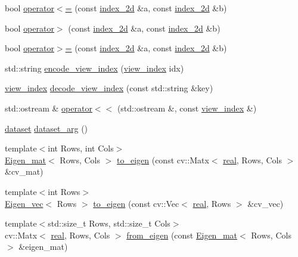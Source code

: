 \begin{DoxyCompactItemize}
\item 
bool \hyperlink{namespacetlz_a022202525838cdfe499e6d27ed189dc2}{operator$<$=} (const \hyperlink{structtlz_1_1index__2d}{index\+\_\+2d} \&a, const \hyperlink{structtlz_1_1index__2d}{index\+\_\+2d} \&b)
\item 
bool \hyperlink{namespacetlz_a9350c25db5668e3720cbf3797a4c879c}{operator$>$} (const \hyperlink{structtlz_1_1index__2d}{index\+\_\+2d} \&a, const \hyperlink{structtlz_1_1index__2d}{index\+\_\+2d} \&b)
\item 
bool \hyperlink{namespacetlz_a37ad12663e6d510b2e739434681b9e59}{operator$>$=} (const \hyperlink{structtlz_1_1index__2d}{index\+\_\+2d} \&a, const \hyperlink{structtlz_1_1index__2d}{index\+\_\+2d} \&b)
\item 
std\+::string \hyperlink{namespacetlz_aadab29bdc80bc1d0ad6d3784dd427992}{encode\+\_\+view\+\_\+index} (\hyperlink{structtlz_1_1view__index}{view\+\_\+index} idx)
\item 
\hyperlink{structtlz_1_1view__index}{view\+\_\+index} \hyperlink{namespacetlz_a74e8454f97dace7cffb1afdb6d3ca87b}{decode\+\_\+view\+\_\+index} (const std\+::string \&key)
\item 
std\+::ostream \& \hyperlink{namespacetlz_ae05c31549882702b59b5eb314196d14c}{operator$<$$<$} (std\+::ostream \&, const \hyperlink{structtlz_1_1view__index}{view\+\_\+index} \&)
\item 
\hyperlink{classtlz_1_1dataset}{dataset} \hyperlink{namespacetlz_a91f1aec7120c97452c495ee447e56b57}{dataset\+\_\+arg} ()
\item 
{\footnotesize template$<$int Rows, int Cols$>$ }\\\hyperlink{namespacetlz_a524ba0d1429b56ff27b8f86c218f9dff}{Eigen\+\_\+mat}$<$ Rows, Cols $>$ \hyperlink{namespacetlz_a029afc2252e5ecc8a0f98a571aa33a0a}{to\+\_\+eigen} (const cv\+::\+Matx$<$ \hyperlink{namespacetlz_a15fd37cce97f2b8b606af18c2615f602}{real}, Rows, Cols $>$ \&cv\+\_\+mat)
\item 
{\footnotesize template$<$int Rows$>$ }\\\hyperlink{namespacetlz_a2956723eeab1e0b07f733e404d96e20e}{Eigen\+\_\+vec}$<$ Rows $>$ \hyperlink{namespacetlz_ae59e2cb22a4d3ae9c8bffa491bc4eb98}{to\+\_\+eigen} (const cv\+::\+Vec$<$ \hyperlink{namespacetlz_a15fd37cce97f2b8b606af18c2615f602}{real}, Rows $>$ \&cv\+\_\+vec)
\item 
{\footnotesize template$<$std\+::size\+\_\+t Rows, std\+::size\+\_\+t Cols$>$ }\\cv\+::\+Matx$<$ \hyperlink{namespacetlz_a15fd37cce97f2b8b606af18c2615f602}{real}, Rows, Cols $>$ \hyperlink{namespacetlz_ab9c83b575db6f56c83d8d1cb6309c0bc}{from\+\_\+eigen} (const \hyperlink{namespacetlz_a524ba0d1429b56ff27b8f86c218f9dff}{Eigen\+\_\+mat}$<$ Rows, Cols $>$ \&eigen\+\_\+mat)

\end{DoxyCompactItemize}
